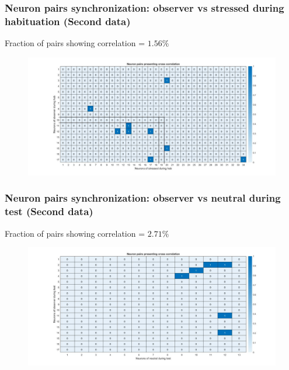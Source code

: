 \documentclass{beamer}
\begin{document}
\begin{frame}
\frametitle{Neuron pairs synchronization: observer vs stressed during habituation (Second data)}


Fraction of pairs showing correlation = $1.56 \%$


\begin{figure}[H]
\begin{center}
\hspace*{-1cm}
\includegraphics[scale=.30]{neur_corr_stress_hab2.jpg} 
\end{center}  


\end{figure}


\end{frame}	







\begin{frame}
\frametitle{Neuron pairs synchronization: observer vs neutral during test (Second data)}


Fraction of pairs showing correlation = $2.71\%$


\begin{figure}[H]
\begin{center}
\hspace*{-1cm}
\includegraphics[scale=.30]{neur_corr_neut2.jpg} 
\end{center}  


\end{figure}


\end{frame}
\end{document}
